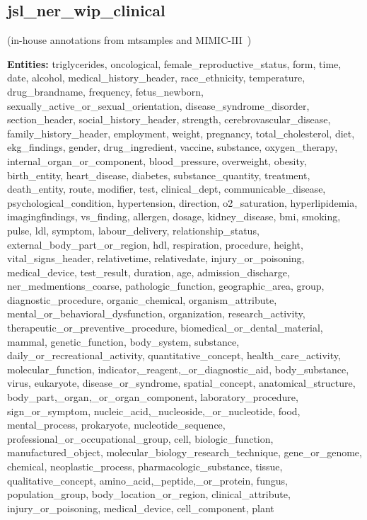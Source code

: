 \documentclass[letterpaper]{article} \usepackage{aaai21}  \usepackage{times}  \usepackage{helvet} \usepackage{courier}  \usepackage[hyphens]{url}  \usepackage{graphicx} \urlstyle{rm} \def\UrlFont{\rm}  \usepackage{natbib}  \usepackage{caption} \frenchspacing  \setlength{\pdfpagewidth}{8.5in}  \setlength{\pdfpageheight}{11in}  \usepackage{lscape}
\begin{document}
\subsection{jsl\_ner\_wip\_clinical}    

(in-house annotations from mtsamples and MIMIC-III~\cite{johnson2016mimic})

\textbf{Entities:} triglycerides, oncological, female\_reproductive\_status, form, time, date, alcohol, medical\_history\_header, race\_ethnicity, temperature, drug\_brandname, frequency, fetus\_newborn, sexually\_active\_or\_sexual\_orientation, disease\_syndrome\_disorder, section\_header, social\_history\_header, strength, cerebrovascular\_disease, family\_history\_header, employment, weight, pregnancy, total\_cholesterol, diet, ekg\_findings, gender, drug\_ingredient, vaccine, substance, oxygen\_therapy, internal\_organ\_or\_component, blood\_pressure, overweight, obesity, birth\_entity, heart\_disease, diabetes, substance\_quantity, treatment, death\_entity, route, modifier, test, clinical\_dept, communicable\_disease, psychological\_condition, hypertension, direction, o2\_saturation, hyperlipidemia, imagingfindings, vs\_finding, allergen, dosage, kidney\_disease, bmi, smoking, pulse, ldl, symptom, labour\_delivery, relationship\_status, external\_body\_part\_or\_region, hdl, respiration, procedure, height, vital\_signs\_header, relativetime, relativedate, injury\_or\_poisoning, medical\_device, test\_result, duration, age, admission\_discharge, ner\_medmentions\_coarse, pathologic\_function, geographic\_area, group, diagnostic\_procedure, organic\_chemical, organism\_attribute, mental\_or\_behavioral\_dysfunction, organization, research\_activity, therapeutic\_or\_preventive\_procedure, biomedical\_or\_dental\_material, mammal, genetic\_function, body\_system, substance, daily\_or\_recreational\_activity, quantitative\_concept, health\_care\_activity, molecular\_function, indicator,\_reagent,\_or\_diagnostic\_aid, body\_substance, virus, eukaryote, disease\_or\_syndrome, spatial\_concept, anatomical\_structure, body\_part,\_organ,\_or\_organ\_component, laboratory\_procedure, sign\_or\_symptom, nucleic\_acid,\_nucleoside,\_or\_nucleotide, food, mental\_process, prokaryote, nucleotide\_sequence, professional\_or\_occupational\_group, cell, biologic\_function, manufactured\_object, molecular\_biology\_research\_technique, gene\_or\_genome, chemical, neoplastic\_process, pharmacologic\_substance, tissue, qualitative\_concept, amino\_acid,\_peptide,\_or\_protein, fungus, population\_group, body\_location\_or\_region, clinical\_attribute, injury\_or\_poisoning, medical\_device, cell\_component, plant
\end{document}
